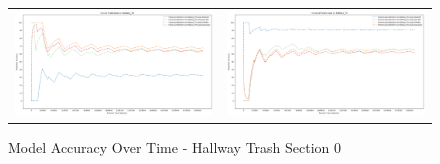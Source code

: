\begin{figure}
  \begin{tabular}{cc}
    {\includegraphics[width = 3in]{images/results/Future_Predictions_on_hallway_T0.png}} &
    {\includegraphics[width = 3in]{images/results/Historical_Predictions_on_hallway_T0.png}} \\
  \end{tabular}
  \caption{Model Accuracy Over Time - Hallway Trash Section 0}
\end{figure}



